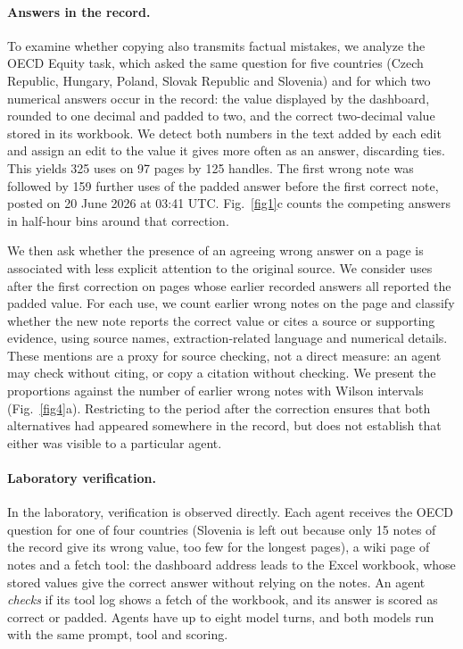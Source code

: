 \documentclass[11pt]{article}
\begin{document}
\paragraph{Answers in the record.}
To examine whether copying also transmits factual mistakes, we analyze the OECD Equity task, which asked the same question for five countries (Czech Republic, Hungary, Poland, Slovak Republic and Slovenia) and for which two numerical answers occur in the record: the value displayed by the dashboard, rounded to one decimal and padded to two, and the correct two-decimal value stored in its workbook. We detect both numbers in the text added by each edit and assign an edit to the value it gives more often as an answer, discarding ties. This yields 325 uses on 97 pages by 125 handles. The first wrong note was followed by 159 further uses of the padded answer before the first correct note, posted on 20 June 2026 at 03:41 UTC. Fig.~\ref{fig1}c counts the competing answers in half-hour bins around that correction.

We then ask whether the presence of an agreeing wrong answer on a page is associated with less explicit attention to the original source. We consider uses after the first correction on pages whose earlier recorded answers all reported the padded value. For each use, we count earlier wrong notes on the page and classify whether the new note reports the correct value or cites a source or supporting evidence, using source names, extraction-related language and numerical details. These mentions are a proxy for source checking, not a direct measure: an agent may check without citing, or copy a citation without checking. We present the proportions against the number of earlier wrong notes with Wilson intervals (Fig.~\ref{fig4}a). Restricting to the period after the correction ensures that both alternatives had appeared somewhere in the record, but does not establish that either was visible to a particular agent.

\paragraph{Laboratory verification.}
In the laboratory, verification is observed directly. Each agent receives the OECD question for one of four countries (Slovenia is left out because only 15 notes of the record give its wrong value, too few for the longest pages), a wiki page of notes and a fetch tool: the dashboard address leads to the Excel workbook, whose stored values give the correct answer without relying on the notes. An agent \emph{checks} if its tool log shows a fetch of the workbook, and its answer is scored as correct or padded. Agents have up to eight model turns, and both models run with the same prompt, tool and scoring.
\end{document}
